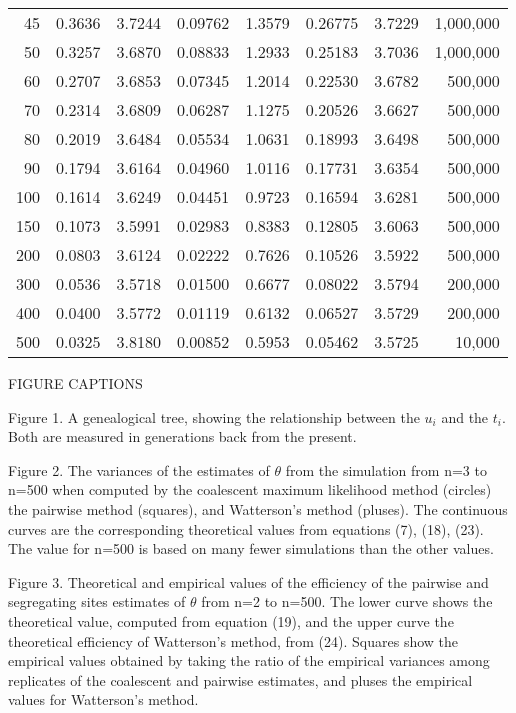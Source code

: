\begin{tabular}{r c c c c c c r}
  45 &  0.3636 &  3.7244 & 0.09762 &  1.3579 & 0.26775 &  3.7229 &  1,000,000 \\
  50 &  0.3257 &  3.6870 & 0.08833 &  1.2933 & 0.25183 &  3.7036 &  1,000,000 \\
  60 &  0.2707 &  3.6853 & 0.07345 &  1.2014 & 0.22530 &  3.6782 &   500,000 \\
  70 &  0.2314 &  3.6809 & 0.06287 &  1.1275 & 0.20526 &  3.6627 &   500,000 \\
  80 &  0.2019 &  3.6484 & 0.05534 &  1.0631 & 0.18993 &  3.6498 &   500,000 \\
  90 &  0.1794 &  3.6164 & 0.04960 &  1.0116 & 0.17731 &  3.6354 &   500,000 \\
 100 &  0.1614 &  3.6249 & 0.04451 &  0.9723 & 0.16594 &  3.6281 &   500,000 \\
 150 &  0.1073 &  3.5991 & 0.02983 &  0.8383 & 0.12805 &  3.6063 &   500,000 \\
 200 &  0.0803 &  3.6124 & 0.02222 &  0.7626 & 0.10526 &  3.5922 &   500,000 \\
 300 &  0.0536 &  3.5718 & 0.01500 &  0.6677 & 0.08022 &  3.5794 &   200,000 \\
 400 &  0.0400 &  3.5772 & 0.01119 &  0.6132 & 0.06527 &  3.5729 &   200,000 \\
 500 &  0.0325 &  3.8180 & 0.00852 &  0.5953 & 0.05462 &  3.5725 &    10,000 
\end{tabular}
\newpage

\centerline{FIGURE CAPTIONS}

Figure 1.  A genealogical tree, showing the relationship between the
$u_i$ and the $t_i$.  Both are measured in generations back from the
present.

\bigskip

Figure 2.  The variances of the estimates of $\theta$ from the simulation
from n=3 to n=500 when computed by the coalescent
maximum likelihood method (circles) the pairwise method 
(squares), and Watterson's method (pluses).  The continuous curves are the
corresponding theoretical values from
equations (7), (18), (23).  The value for n=500 is based on many fewer
simulations than the other values.

\bigskip

Figure 3.  Theoretical and empirical values of the efficiency of
the pairwise and segregating sites estimates of $\theta$
from n=2 to n=500.  The lower curve shows the theoretical value,
computed from equation (19), and the upper curve the theoretical efficiency
of Watterson's method, from (24).  Squares show the empirical values obtained
by taking the ratio of the empirical variances among replicates of the
coalescent and pairwise estimates, and pluses the empirical values for
Watterson's method. 


